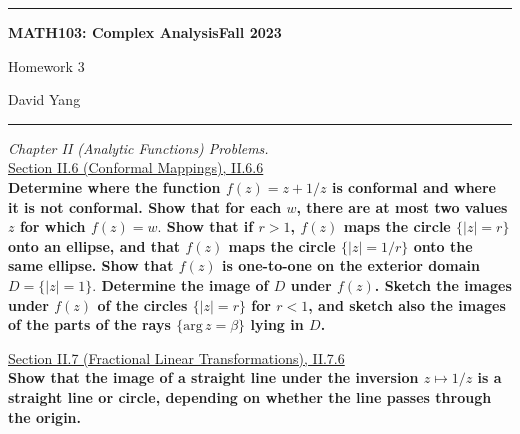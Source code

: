 \documentclass[11pt]{article}
\theoremstyle{definition}
\begin{document}
	\hrule
	\begin{center}
        \textbf{MATH103: Complex Analysis}\hfill \textbf{Fall 2023}\newline

		{\Large Homework 3}

		David Yang
	\end{center}

\hrule

\vspace{1em}


\textit{Chapter II (Analytic Functions) Problems.} \\

\underline{Section II.6 (Conformal Mappings), II.6.6} \\

\textbf{Determine where the function $f(z) = z + 1/z$ is conformal and where it is not conformal. Show that for each $w$, there are at most two values $z$ for which $f(z) = w.$
Show that if $r > 1$, $f(z)$ maps the circle $\{|z| = r\}$ onto an ellipse, and that $f(z)$ maps the circle $\{|z| = 1/r\}$ onto the same ellipse. 
Show that $f(z)$ is one-to-one on the exterior domain $D = \{|z| = 1\}.$ Determine the image of $D$ under $f(z)$. Sketch the images under $f(z)$ of the circles $\{|z| = r\}$ for $r < 1$, and sketch also the images of the parts of the rays $\{\mathrm{arg} \, z = \beta \}$ lying in $D$.}

\newpage

\underline{Section II.7 (Fractional Linear Transformations), II.7.6} \\

\textbf{Show that the image of a straight line under the inversion $z \mapsto 1/z$ is a straight line or circle, depending on whether the line passes through the origin.} \\
\end{document}
